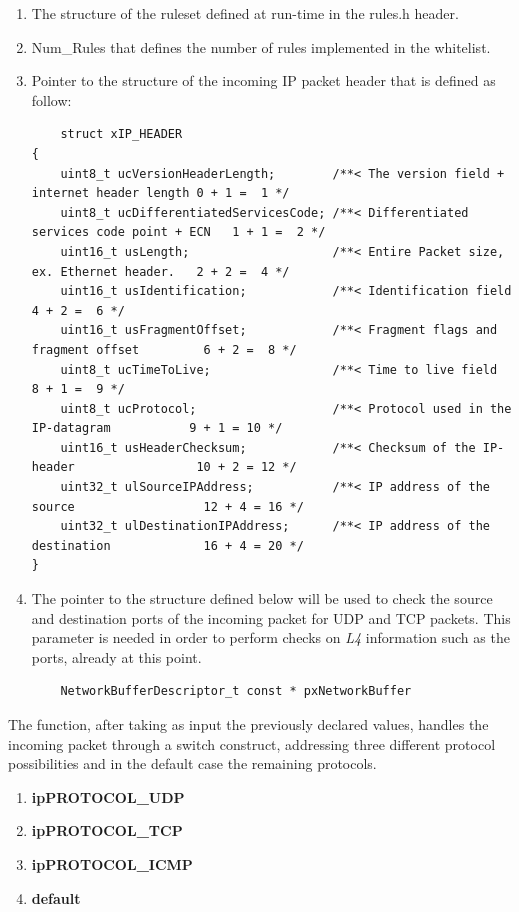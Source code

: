 \documentclass{exam}
\begin{document}
\begin{enumerate}
\item The structure of the ruleset defined at run-time in the rules.h header.
\item Num\_Rules that defines the number of rules implemented in the whitelist. 
\item Pointer to the structure of the incoming IP packet header that is defined as follow:
\begin{lstlisting}
    struct xIP_HEADER
{
    uint8_t ucVersionHeaderLength;        /**< The version field + internet header length 0 + 1 =  1 */
    uint8_t ucDifferentiatedServicesCode; /**< Differentiated services code point + ECN   1 + 1 =  2 */
    uint16_t usLength;                    /**< Entire Packet size, ex. Ethernet header.   2 + 2 =  4 */
    uint16_t usIdentification;            /**< Identification field                       4 + 2 =  6 */
    uint16_t usFragmentOffset;            /**< Fragment flags and fragment offset         6 + 2 =  8 */
    uint8_t ucTimeToLive;                 /**< Time to live field                         8 + 1 =  9 */
    uint8_t ucProtocol;                   /**< Protocol used in the IP-datagram           9 + 1 = 10 */
    uint16_t usHeaderChecksum;            /**< Checksum of the IP-header                 10 + 2 = 12 */
    uint32_t ulSourceIPAddress;           /**< IP address of the source                  12 + 4 = 16 */
    uint32_t ulDestinationIPAddress;      /**< IP address of the destination             16 + 4 = 20 */
}
\end{lstlisting}
\item The pointer to the structure defined below will be used to check the source and destination ports of the incoming packet for UDP and TCP packets. This parameter is needed in order to perform checks on \textit{L4} information such as the ports, already at this point.
\begin{lstlisting}
    NetworkBufferDescriptor_t const * pxNetworkBuffer
\end{lstlisting}
\end{enumerate}
The function, after taking as input the previously declared values, handles the incoming packet through a switch construct, addressing three different protocol possibilities and in the default case the remaining protocols.
\begin{enumerate}
	\item	\textbf{ipPROTOCOL\_UDP}
	\item	\textbf{ipPROTOCOL\_TCP}
        \item   \textbf{ipPROTOCOL\_ICMP}
	\item	\textbf{default}
\end{enumerate}
\end{document}
